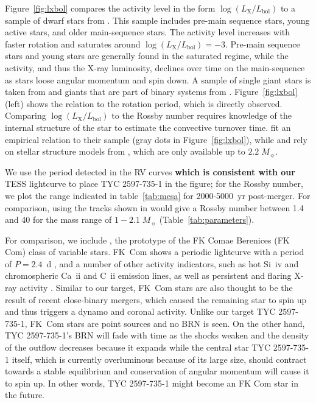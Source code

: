 \documentclass[linenumbers]{aastex631}
\begin{document}
Figure~\ref{fig:lxbol} compares the activity level in the form $\log(L_\mathrm{X}/L_\mathrm{bol})$ to a sample of dwarf stars from \citet{Wright+2011}. This sample includes pre-main sequence stars, young active stars, and older main-sequence stars. The activity level increases with faster rotation and saturates around $\log(L_\mathrm{X}/L_\mathrm{bol})=-3$. Pre-main sequence stars and young stars are generally found in the saturated regime, while the activity, and thus the X-ray luminosity, declines over time on the main-sequence as stars loose angular momentum and spin down.  A sample of single giant stars is taken from \citet{Gondoin+2005} and giants that are part of binary systems from \citet{Gondoin+2007}. Figure~\ref{fig:lxbol} (left) shows the relation to the rotation period, which is directly observed. Comparing $\log(L_\mathrm{X}/L_\mathrm{bol})$ to the Rossby number requires knowledge of the internal structure of the star to estimate the convective turnover time. \citet{Wright+2011} fit an empirical relation to their sample (gray dots in  Figure~\ref{fig:lxbol}), while \citet{Gondoin+2005} and \citet{Gondoin+2007} rely on stellar structure models from \citet{Gunn1998}, which are only available up to $2.2\;M_\sun$.

We use the period detected in the RV curves \textbf{which is consistent with our} TESS lightcurve to place TYC 2597-735-1 in the figure; for the Rossby number, we plot the range indicated in table~\ref{tab:mesa} for 2000-5000~yr post-merger. For comparison, using the tracks shown in \citet{Gunn1998} would give a Rossby number between 1.4 and 40 for the mass range of $1-2.1\;M_\sun{}$ (Table~\ref{tab:parameters}).

For comparison, we include , the prototype of the FK Comae Berenices (FK Com) class of variable stars. FK~Com shows a periodic lightcurve with a period of $P=2.4$~d \citep{1993A&A...278..449J}, and a number of other activity indicators, such as hot Si~{\sc iv} and chromospheric Ca~{\sc ii} and C~{\sc ii} emission lines, as well as persistent and flaring X-ray activity \citep{2016ApJS..223....5A}. Similar to our target, FK~Com stars are also thought to be the result of recent close-binary mergers, which caused the remaining star to spin up and thus triggers a dynamo and coronal activity. Unlike our target TYC 2597-735-1, FK~Com stars are point sources and no BRN is seen. On the other hand, TYC 2597-735-1's BRN will fade with time as the shocks weaken and the density of the outflow decreases because it expands while the central star TYC 2597-735-1 itself, which is currently overluminous because of its large size, should contract towards a stable equilibrium and conservation of angular momentum will cause it to spin up. In other words, TYC 2597-735-1 might become an FK Com star in the future.
\end{document}
